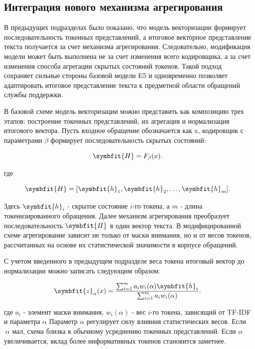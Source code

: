 \documentclass[14pt,a4paper]{extarticle}
\numberwithin{figure}{section}
\numberwithin{table}{section}
\begin{document}
\subsection{Интеграция нового механизма агрегирования}

В предыдущих подразделах было показано, что модель векторизации
формирует последовательность токенных представлений, а итоговое векторное представление текста получается за счет механизма агрегирования. Следовательно,
модификация модели может быть выполнена не за счет изменения всего
кодировщика, а за счет изменения способа агрегации скрытых состояний
токенов. Такой подход сохраняет сильные стороны базовой модели E5 и
одновременно позволяет адаптировать итоговое представление текста к
предметной области обращений службы поддержки.

В базовой схеме модель векторизации можно представить как композицию
трех этапов: построение токенных представлений, их агрегация и
нормализация итогового вектора. Пусть входное обращение обозначается как
x, кодировщик с параметрами \(\beta\) формирует последовательность скрытых
состояний:

\begin{equation}\symbfit{H}=F_{\beta}(x).\end{equation}

где

\begin{equation}\symbfit{H}=[\symbfit{h}_1,\symbfit{h}_2,\ldots,\symbfit{h}_m].\end{equation}

Здесь \(\symbfit{h}_i\) - скрытое состояние \(i\)-го токена, а \(m\) - длина
токенизированного обращения. Далее механизм агрегирования преобразует
последовательность \(\symbfit{H}\) в один вектор текста. В модифицированной схеме
агрегирование зависит не только от маски внимания, но и от весов токенов,
рассчитанных на основе их статистической значимости в корпусе обращений.

С учетом введенного в предыдущем подразделе веса токена итоговый вектор
до нормализации можно записать следующим образом:

\begin{equation}\symbfit{z}_{\alpha}(x)=\frac{\sum_{i=1}^{m}a_iw_i(\alpha)\symbfit{h}_i}{\sum_{i=1}^{m}a_iw_i(\alpha)}.\end{equation}

где \(a_i\) - элемент маски внимания, \(w_i(\alpha)\) - вес \(i\)-го
токена, зависящий от TF-IDF и параметра \(\alpha\) Параметр \(\alpha\)
регулирует силу влияния статистических весов. Если\(\ \alpha\) мал,
схема близка к обычному усреднению токенных представлений. Если \(\alpha\) увеличивается,
вклад более информативных токенов становится заметнее.
\end{document}
